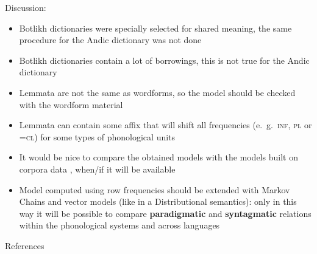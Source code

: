 \documentclass[13pt, t]{beamer}
\begin{document}


\begin{frame}{Discussion:}
\begin{itemize}
\item Botlikh dictionaries were specially selected for shared meaning, the same procedure for the Andic dictionary was not done \pause
\item Botlikh dictionaries contain a lot of borrowings, this is not true for the Andic dictionary \pause
\item Lemmata are not the same as wordforms, so the model should be checked with the wordform material \pause
\item Lemmata can contain some affix that will shift all frequencies (e.~g.~\textsc{inf}, \textsc{pl} or \textsc{=cl}) for some types of phonological units \pause
\item It would be nice to compare the obtained models with the models built on corpora data \pause, when/if it will be available \pause
\item Model computed using row frequencies should be extended with Markov Chains and vector models (like in a Distributional semantics)\pause: only in this way it will be possible to compare \textbf{paradigmatic} and  \textbf{syntagmatic} relations within the phonological systems and across languages
\end{itemize}
\end{frame}


\begin{frame}{References}
\footnotesize


\end{frame}
\end{document}
